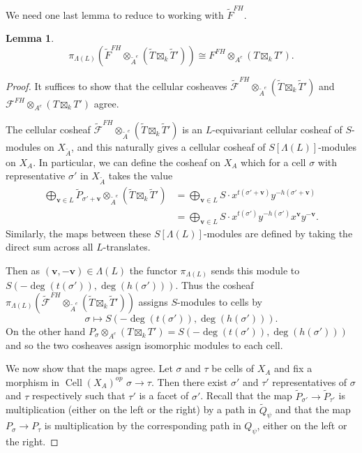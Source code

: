 \documentclass{amsart}
\newcommand{\field}{k}
\DeclareMathOperator{\Cell}{Cell}
\newtheorem{lemma}[theorem]{Lemma}
\theoremstyle{remark}
\begin{document}
We need one last lemma to reduce to working with $\widetilde{F}^{FH}$.
\begin{lemma}
  \label{lem:FHquotient}
  \[\pi_{\Lambda(L)}(\widetilde{F}^{FH}\otimes_{\widetilde{A}^{e}} (\widetilde{T}\boxtimes_{\field} \widetilde{T}')) \cong F^{FH}\otimes_{A^e} (T\boxtimes_{\field} T').\]
\end{lemma}
\begin{proof}

  It suffices to show that the cellular cosheaves $\widetilde{\mathcal{F}}^{FH}\otimes_{\widetilde{A}^e} (\widetilde{T}\boxtimes_{\field} \widetilde{T}')$ and $\mathcal{F}^{FH}\otimes_{A^e} (T\boxtimes_{\field} T')$ agree. 
  
  The cellular cosheaf $\widetilde{\mathcal{F}}^{FH}\otimes_{\widetilde{A}^e} (\widetilde{T}\boxtimes_{\field} \widetilde{T}')$ is an $L$-equivariant cellular cosheaf of $S$-modules on $X_{\widetilde{A}}$, and this naturally gives a cellular cosheaf of $S[\Lambda(L)]$-modules on $X_{A}$. In particular, we can define the cosheaf on $X_A$ which for a cell $\sigma$ with representative $\sigma'$ in $X_{\widetilde{A}}$ takes the value
  \begin{align*}
    \bigoplus_{\bm{v}\in L}\widetilde{P}_{\sigma'+\bm{v}}\otimes_{\widetilde{A}^e} (\widetilde{T}\boxtimes_{\field} \widetilde{T}') &= \bigoplus_{\bm{v}\in L}S\cdot x^{t(\sigma'+\bm{v})}y^{-h(\sigma'+\bm{v})}\\
      &= \bigoplus_{\bm{v}\in L}S\cdot x^{t(\sigma')}y^{-h(\sigma')}x^{\bm{v}}y^{-\bm{v}}.
  \end{align*}
  Similarly, the maps between these $S[\Lambda(L)]$-modules are defined by taking the direct sum across all $L$-translates.

  Then as $(\bm{v},-\bm{v})\in \Lambda(L)$ the functor $\pi_{\Lambda(L)}$ sends this module to $S(-\deg(t(\sigma')),\deg(h(\sigma')))$. Thus the cosheaf $\pi_{\Lambda(L)}(\widetilde{\mathcal{F}}^{FH}\otimes_{\widetilde{A}^e} (\widetilde{T}\boxtimes_{\field} \widetilde{T}'))$ assigns $S$-modules to cells by
  \[\sigma\mapsto S(-\deg(t(\sigma')),\deg(h(\sigma'))).\]
  On the other hand $P_{\sigma}\otimes_{A^e} (T\boxtimes_{\field}T')=S(-\deg(t(\sigma')),\deg(h(\sigma')))$ and so the two cosheaves assign isomorphic modules to each cell.

  We now show that the maps agree. Let $\sigma$ and $\tau$ be cells of $X_A$ and fix a morphism in $\Cell(X_A)^{op}$ $\sigma\rightarrow \tau$. Then there exist $\sigma'$ and $\tau'$ representatives of $\sigma$ and $\tau$ respectively such that $\tau'$ is a facet of $\sigma'$. Recall that the map $\widetilde{P}_{\sigma'}\rightarrow \widetilde{P}_{\tau'}$ is multiplication (either on the left or the right) by a path in $\widetilde{Q}_\psi$ and that the map $P_\sigma\rightarrow P_{\tau}$ is multiplication by the corresponding path in $Q_\psi$, either on the left or the right.


\end{proof}
\end{document}
